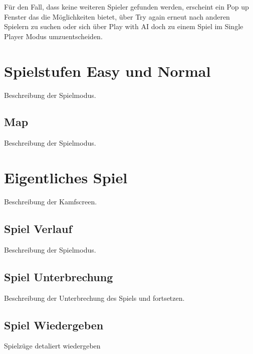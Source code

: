 \documentclass[fontsize=12pt,paper=a4,twoside]{scrartcl}
\begin{document}
Für den Fall, dass keine weiteren Spieler gefunden werden, erscheint ein Pop up Fenster das die Möglichkeiten bietet, über Try again erneut nach anderen Spielern zu suchen
oder sich über Play with AI doch zu einem Spiel im Single Player Modus umzuentscheiden.\\
 
\newpage
\section{Spielstufen Easy und Normal}


Beschreibung der Spielmodus.
\subsection{Map}
Beschreibung der Spielmodus.

\section{Eigentliches Spiel}
Beschreibung der Kamfscreen.
\subsection{Spiel Verlauf}
Beschreibung der Spielmodus.

\subsection{Spiel Unterbrechung}
Beschreibung der Unterbrechung des Spiels und fortsetzen.


\subsection{Spiel Wiedergeben}
Spielzüge detaliert wiedergeben
\end{document}
